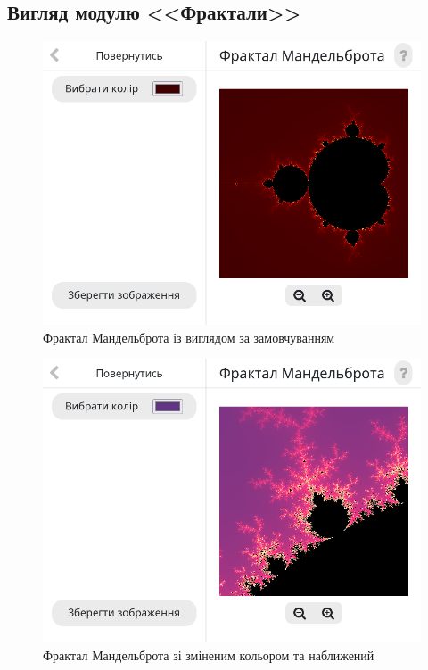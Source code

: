 \documentclass[oneside,14pt]{extarticle}
\begin{document}
\begin{normalsize}
	\subsection{Вигляд модулю <<Фрактали>>}
	\begin{figure}[H]
		\centering
		\includegraphics[scale=0.6]{11}
		\caption{Фрактал Мандельброта із виглядом за замовчуванням}
	\end{figure}
	
	\begin{figure}[H]
		\centering
		\includegraphics[scale=0.6]{12}
		\caption{Фрактал Мандельброта зі зміненим кольором та наближений}
	\end{figure}
	

\end{normalsize}
\end{document}
